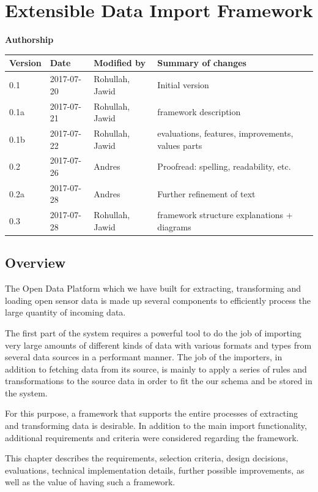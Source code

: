 \section{Extensible Data Import Framework}\label{sec:import-framework}

\textbf{Authorship}

\begin{longtable}{@{}llll@{}}
\toprule
Version & Date & Modified by & Summary of changes \\
\midrule
\endhead
0.1 & 2017-07-20 & Rohullah, Jawid & Initial version \\
0.1a & 2017-07-21 & Rohullah, Jawid & framework description \\
0.1b & 2017-07-22 & Rohullah, Jawid & evaluations, features, improvements, values parts \\
0.2 & 2017-07-26 & Andres & Proofread: spelling, readability, etc. \\
0.2a & 2017-07-28 & Andres & Further refinement of text \\
0.3 & 2017-07-28 & Rohullah, Jawid & framework structure explanations + diagrams \\
\bottomrule
\end{longtable}

\subsection{Overview}\label{overview}

The Open Data Platform which we have built for extracting, transforming
and loading open sensor data is made up several components to efficiently
process the large quantity of incoming data.

The first part of the system requires a powerful tool to do the job of
importing very large amounts of different kinds of data with various
formats and types from several data sources in a performant manner. The
job of the importers, in addition to fetching data from its source,
is mainly to apply a series of rules and transformations to the source
data in order to fit the our schema and be stored in the system.

For this purpose, a framework that supports the entire processes of
extracting and transforming data is desirable. In addition to the
main import functionality, additional requirements and criteria were
considered regarding the framework.

This chapter describes the requirements, selection criteria, design
decisions, evaluations, technical implementation details, further
possible improvements, as well as the value of having such a framework.

